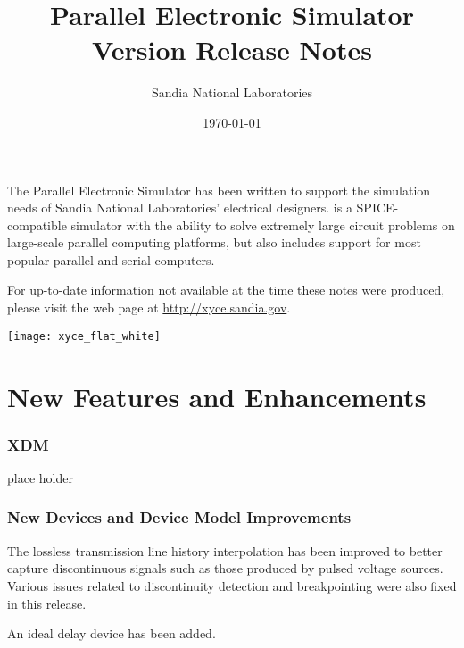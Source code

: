 \documentclass[letterpaper]{scrartcl}
\title{\XyceTitle{} Parallel Electronic Simulator\\
Version \XyceVersionVar{} Release Notes}
\author{ Sandia National Laboratories}
\date{\today}
\begin{document}
\maketitle

The \XyceTM{} Parallel Electronic Simulator has been written to support the
simulation needs of Sandia National Laboratories' electrical designers.
\XyceTM{} is a SPICE-compatible simulator with the ability to solve extremely
large circuit problems on large-scale parallel computing platforms, but also
includes support for most popular parallel and serial computers.

For up-to-date information not available at the time these notes were produced,
please visit the \XyceTM{} web page at
{\color{XyceDeepRed}\url{http://xyce.sandia.gov}}.

\tableofcontents
\vspace*{\fill}
\parbox{\textwidth}
{
  \hfill
  \texttt{[image: xyce\_flat\_white]}
}


\newpage
\section{New Features and Enhancements}

\subsubsection*{XDM}
\begin{XyceItemize}
  \item place holder
\end{XyceItemize}

\subsubsection*{New Devices and Device Model Improvements}
\begin{XyceItemize}
  \item The lossless transmission line history interpolation has been
    improved to better capture discontinuous signals such as those
    produced by pulsed voltage sources.  Various issues related to
    discontinuity detection and breakpointing were also fixed in this
    release.
  \item An ideal delay device has been added.
\end{XyceItemize}
\end{document}
